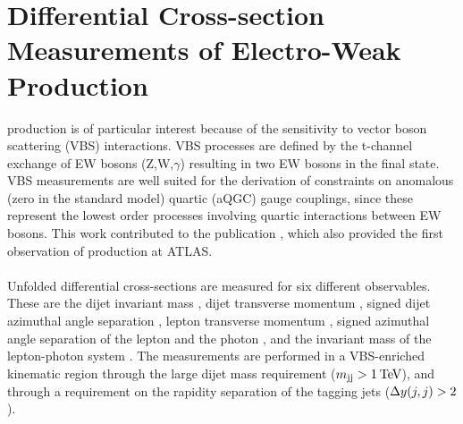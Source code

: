 \documentclass{thesissummary}
\begin{document}
\section{Differential Cross-section Measurements of Electro-Weak \wyjj Production}

\Ewwy production is of particular interest because of the sensitivity to vector boson scattering (VBS) interactions. VBS processes are defined by the t-channel exchange of EW bosons (Z,W,$\gamma$) resulting in two EW bosons in the final state. VBS measurements are well suited for the derivation of constraints on anomalous (zero in the standard model) quartic (aQGC) gauge couplings, since these represent the lowest order processes involving quartic interactions between EW bosons. This work contributed to the publication \cite{vbswy}, which also provided the first observation of \ewwy production at ATLAS. 
\\\\
%
Unfolded differential cross-sections are measured for six different observables. These are the dijet invariant mass \mjj, dijet transverse momentum \ptjj, signed dijet azimuthal angle separation \jjdphi, lepton transverse momentum \ptlep, signed azimuthal angle separation of the lepton and the photon \lepgamdphi, and the invariant mass of the lepton-photon system \mly. The measurements are performed in a VBS-enriched kinematic region through the large dijet mass requirement ($m_{\text{jj}}>1\hspace{2pt}\text{Te\kern -0.1em V}$), and through a requirement on the rapidity separation of the tagging jets ($\Delta y(j,j)>2$). 
\end{document}
